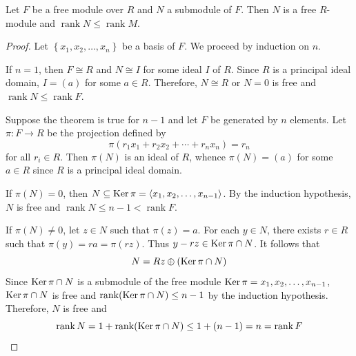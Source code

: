 \begin{theorem}
    \label{thm: submodule of a module over P.I.D}
    Let $F$ be a free module over $R$ and $N$ a submodule of $F$.
    Then $N$ is a free $R$-module and $\operatorname{rank} N \leq \operatorname{rank} M$.
    \begin{proof}
        Let $\left\{x_1, x_2, \ldots, x_n\right\}$ be a basis of $F$.
        We proceed by induction on $n$.

        If $n=1$, then $F \cong R$ and $N \cong I$ for some ideal $I$ of $R$. Since $R$ is a principal ideal domain, $I=(a)$ for some $a \in R$. Therefore, $N \cong R$ or $N=0$ is free and $\operatorname{rank} N \leq \operatorname{rank} F$.

        Suppose the theorem is true for $n-1$ and let $F$ be generated by $n$ elements.
        Let $\pi: F \rightarrow R$ be the projection defined by
        \begin{equation*}
            \pi\left(r_1 x_1+r_2 x_2+\cdots+r_n x_n\right)=r_n
        \end{equation*}
        for all $r_i \in R$.
        Then $\pi(N)$ is an ideal of $R$, whence $\pi(N)=(a)$ for some $a \in R$ since $R$ is a principal ideal domain.

        If $\pi(N)=0$, then $N \subseteq \operatorname{\operatorname{Ker}} \pi=\langle x_1, x_2, \ldots, x_{n-1}\rangle$. By the induction hypothesis, $N$ is free and $\operatorname{rank} N \leq n-1<\operatorname{rank} F$.

        If $\pi(N) \neq 0$, let $z \in N$ such that $\pi(z)=a$. For each $y \in N$, there exists $r \in R$ such that $\pi(y)=r a=\pi(r z)$. Thus $y-r z \in \operatorname{\operatorname{Ker}} \pi \cap N$. It follows that
        \begin{equation*}
            N=R z \oplus(\operatorname{\operatorname{Ker}} \pi \cap N)
        \end{equation*}
        Since $\operatorname{\operatorname{Ker}} \pi \cap N$ is a submodule of the free module $\operatorname{\operatorname{Ker}} \pi= x_1, x_2, \ldots, x_{n-1}$, $\operatorname{\operatorname{Ker}} \pi \cap N$ is free and $\operatorname{rank}(\operatorname{\operatorname{Ker}} \pi \cap N) \leq n-1$ by the induction hypothesis. Therefore, $N$ is free and
        \begin{equation*}
            \operatorname{rank} N
            =
            1+\operatorname{rank}(\operatorname{\operatorname{Ker}} \pi \cap N)
            \leq
            1+(n-1)
            =
            n
            =
            \operatorname{rank} F
        \end{equation*}
    \end{proof}
\end{theorem}

